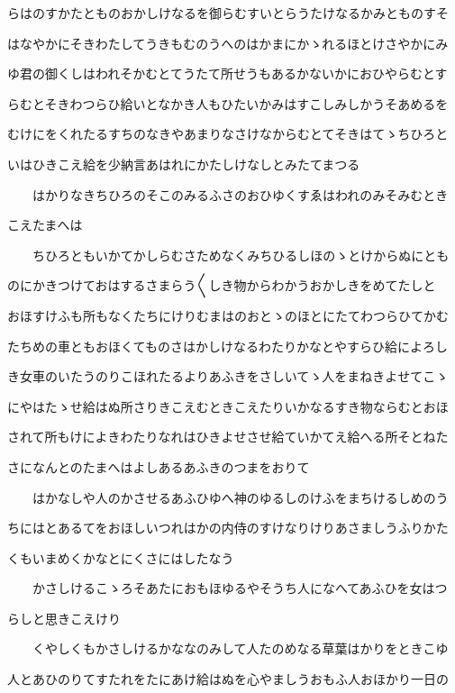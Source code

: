 \documentclass[a4paper,11pt,landscape]{ltjtarticle}
\begin{document}
らはのすかたとものおかしけなるを御らむすいとらうたけなるかみとものすそ
\par\medskip
はなやかにそきわたしてうきもむのうへのはかまにかゝれるほとけさやかにみ
\par\medskip
ゆ君の御くしはわれそかむとてうたて所せうもあるかないかにおひやらむとす
\par\medskip
らむとそきわつらひ給いとなかき人もひたいかみはすこしみしかうそあめるを
\par\medskip
むけにをくれたるすちのなきやあまりなさけなからむとてそきはてゝちひろと
\par\medskip
いはひきこえ給を少納言あはれにかたしけなしとみたてまつる
\par\medskip
　　はかりなきちひろのそこのみるふさのおひゆくすゑはわれのみそみむとき
\par\medskip
こえたまへは
\par\medskip
　　ちひろともいかてかしらむさためなくみちひるしほのゝとけからぬにとも
\par\medskip
のにかきつけておはするさまらう〱しき物からわかうおかしきをめてたしと
\par\medskip
おほすけふも所もなくたちにけりむまはのおとゝのほとにたてわつらひてかむ
\par\medskip
たちめの車ともおほくてものさはかしけなるわたりかなとやすらひ給によろし
\par\medskip
き女車のいたうのりこほれたるよりあふきをさしいてゝ人をまねきよせてこゝ
\par\medskip
にやはたゝせ給はぬ所さりきこえむときこえたりいかなるすき物ならむとおほ
\par\medskip
されて所もけによきわたりなれはひきよせさせ給ていかてえ給へる所そとねた
\par\medskip
さになんとのたまへはよしあるあふきのつまをおりて
\par\medskip
　　はかなしや人のかさせるあふひゆへ神のゆるしのけふをまちけるしめのう
\par\medskip
ちにはとあるてをおほしいつれはかの内侍のすけなりけりあさましうふりかた
\par\medskip
くもいまめくかなとにくさにはしたなう
\par\medskip
　　かさしけるこゝろそあたにおもほゆるやそうち人になへてあふひを女はつ
\par\medskip
らしと思きこえけり
\par\medskip
　　くやしくもかさしけるかななのみして人たのめなる草葉はかりをときこゆ
\par\medskip
人とあひのりてすたれをたにあけ給はぬを心やましうおもふ人おほかり一日の
\end{document}
